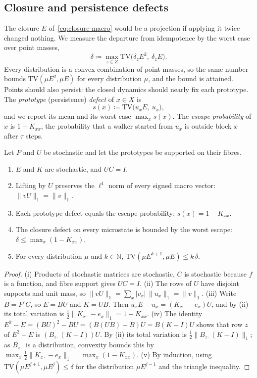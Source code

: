 \documentclass[11pt]{article}
\newcommand{\N}{\mathbb{N}}
\newcommand{\TV}{\mathrm{TV}}
\begin{document}
\subsection{Closure and persistence defects}

The closure $E$ of~\eqref{eq:closure-macro} would be a projection if applying it twice changed nothing.
We measure the departure from idempotence by the worst case over point masses,
\begin{equation}
\delta\coloneqq \max_{z\in Z}\TV\bigl(\delta_zE^2,\ \delta_zE\bigr).
\label{eq:delta}
\end{equation}
Every distribution is a convex combination of point masses, so the same number bounds $\TV(\mu E^2,\mu E)$ for every distribution $\mu$, and the bound is attained.
Points should also persist: the closed dynamics should nearly fix each prototype.
The \emph{prototype} (persistence) \emph{defect} of $x\in X$ is
\begin{equation}
s(x)\coloneqq \TV\bigl(u_xE,\ u_x\bigr),
\label{eq:stability}
\end{equation}
and we report its mean and its worst case $\max_x s(x)$.
The \emph{escape probability} of $x$ is $1-K_{xx}$, the probability that a walker started from $u_x$ is outside block $x$ after $\tau$ steps.

\begin{proposition}
\label{prop:closure-basic}
Let $P$ and $U$ be stochastic and let the prototypes be supported on their fibres.
\begin{enumerate}[label=(\roman*)]
\item $E$ and $K$ are stochastic, and $UC=I$.
\item Lifting by $U$ preserves the $\ell^1$ norm of every signed macro vector: $\|vU\|_1=\|v\|_1$.
\item Each prototype defect equals the escape probability: $s(x)=1-K_{xx}$.
\item The closure defect on every microstate is bounded by the worst escape:
$\delta\le\max_{x}(1-K_{xx})$.
\item For every distribution $\mu$ and $k\in\N$, $\TV(\mu E^{k+1},\mu E)\le k\,\delta$.
\end{enumerate}
\end{proposition}

\begin{proof}
(i) Products of stochastic matrices are stochastic, $C$ is stochastic because $f$ is a function, and fibre support gives $UC=I$.
(ii) The rows of $U$ have disjoint supports and unit mass, so $\|vU\|_1=\sum_x|v_x|\,\|u_x\|_1=\|v\|_1$.
(iii) Write $B=P^{\tau}C$, so $E=BU$ and $K=UB$.
Then $u_xE-u_x=(K_{x\cdot}-e_x)U$, and by (ii) its total variation is $\tfrac12\|K_{x\cdot}-e_x\|_1=1-K_{xx}$.
(iv) The identity $E^2-E=(BU)^2-BU=(B(UB)-B)U=B(K-I)U$ shows that row $z$ of $E^2-E$ is $(B_{z\cdot}(K-I))U$.
By (ii) its total variation is $\tfrac12\|B_{z\cdot}(K-I)\|_1$; as $B_{z\cdot}$ is a distribution, convexity bounds this by $\max_x\tfrac12\|K_{x\cdot}-e_x\|_1=\max_x(1-K_{xx})$.
(v) By induction, using $\TV(\mu E^{j+1},\mu E^{j})\le\delta$ for the distribution $\mu E^{j-1}$ and the triangle inequality.
\end{proof}
\end{document}
